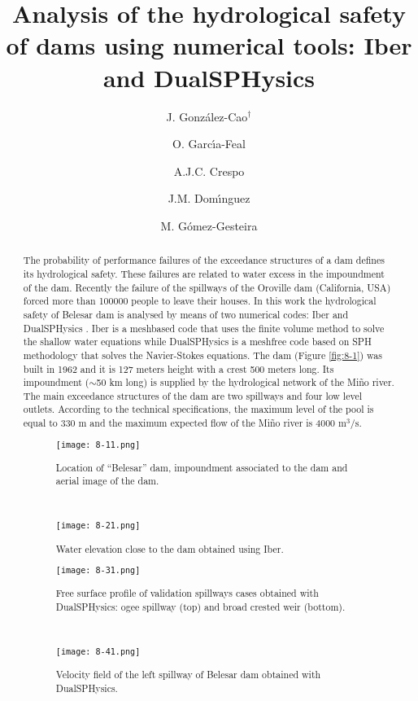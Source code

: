 \documentclass[10pt]{article}
\title{Analysis of the hydrological safety of dams using numerical tools: Iber and DualSPHysics}
\date{}
\author[$\relax$]{J. Gonz\'alez-Cao$^\dagger$}
\author[$\relax$]{O. Garc{\'\i}a-Feal}
\author[$\relax$]{A.J.C. Crespo}
\author[$\relax$]{J.M. Dom{\'\i}nguez}
\author[$\relax$]{M. G\'{o}mez-Gesteira}
\affil[$\relax$]{Enviromental Physics Laboratory (EPHYSLAB), Universidade de Vigo, Campus As Lagoas, Orense, Spain}
\affil[$\relax$]{\email{\dagger}{ jgcao@uvigo.es}}
\begin{document}
\maketitle


\begin{abstract}
The probability of performance failures of the exceedance structures of a dam defines its hydrological safety. These failures are related to water excess in the impoundment of the dam. Recently the failure of the spillways of the Oroville dam (California, USA) forced more than 100000 people to leave their houses. In this work the hydrological safety of Belesar dam is analysed by means of two numerical codes: Iber \cite{crespo2015dualsphysics} and DualSPHysics \cite{blade2014iber}. Iber is a meshbased code that uses the finite volume method to solve the shallow water equations while DualSPHysics is a meshfree code based on SPH methodology that solves the Navier-Stokes equations. The dam (Figure \ref{fig:8-1}) was built in 1962 and it is 127 meters height with a crest 500 meters long. Its impoundment ($\sim$50 km long) is supplied by the hydrological network of the Mi\~{n}o river. The main exceedance structures of the dam are two spillways and four low level outlets. According to the technical specifications, the maximum level of the pool is equal to 330 m and the maximum expected flow of the Mi\~{n}o river is 4000 $\mathrm{m^3/s}$.

\begin{figure}[!htb]
\begin{minipage}[b]{0.42\linewidth}
\centering
\texttt{[image: 8-11.png]}
\caption{Location of ``Belesar'' dam, impoundment associated to the dam and aerial image of the dam.}\label{fig:8-1}
\end{minipage}
\begin{minipage}[b]{0.05\linewidth}
~
\end{minipage}
\begin{minipage}[b]{0.5\linewidth}
\centering
\texttt{[image: 8-21.png]}
\caption{Water elevation close to the dam obtained using Iber.}\label{fig:8-2}
\end{minipage}
\end{figure}
\begin{figure}[!htb]
\begin{minipage}[b]{0.42\linewidth}
\centering
\texttt{[image: 8-31.png]}
\caption{Free surface profile of validation spillways cases obtained with DualSPHysics: ogee spillway (top) and broad crested weir (bottom).}\label{fig:8-3}
\end{minipage}
\begin{minipage}[b]{0.05\linewidth}
~
\end{minipage}
\begin{minipage}[b]{0.5\linewidth}
\centering
\texttt{[image: 8-41.png]}
\caption{Velocity field of the left spillway of Belesar dam obtained with DualSPHysics.}\label{fig:8-4}
\end{minipage}
\end{figure}


\end{abstract}
\end{document}
